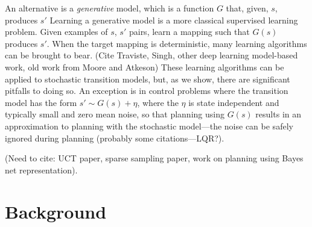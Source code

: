 \documentclass[letterpaper]{article} %
\begin{document}
An alternative is a \emph{generative} model, which is a function $G$ that, given, $s$, produces $s'$
%
%
Learning a generative model is a more classical supervised learning problem. Given examples of $s$, $s'$ pairs, learn a mapping such that $G(s)$ produces $s'$. When the target mapping is deterministic, many learning algorithms can be brought to bear. (Cite Traviste, Singh, other deep learning model-based work, old work from Moore and Atkeson) These learning algorithms can be applied to stochastic transition models, but, as we show, there are significant pitfalls to doing so. An exception is in control problems where the transition model has the form $s' \sim G(s) + \eta$, where the $\eta$ is state independent and typically small and zero mean noise, so that planning using $G(s)$ results in an approximation to planning with the stochastic model---the noise can be safely ignored during planning (probably some citations---LQR?).

(Need to cite: UCT paper, sparse sampling paper, work on planning using Bayes net representation).

\section{Background}
\end{document}
